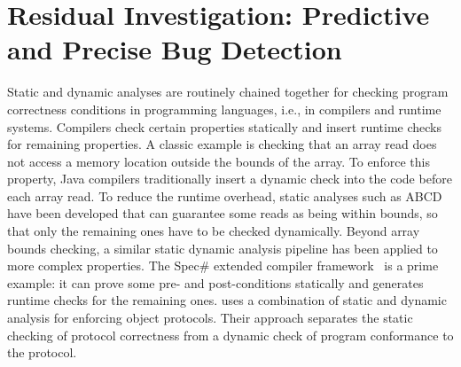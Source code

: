 \section{Residual Investigation: Predictive and Precise Bug Detection}


Static and dynamic analyses are routinely chained together for
checking program correctness conditions in programming languages,
i.e., in compilers and runtime systems. Compilers check certain
properties statically and insert runtime checks for remaining
properties. A classic example is checking that an array read does not
access a memory location outside the bounds of the array. To enforce
this property, Java compilers traditionally insert a dynamic check
into the code before each array read. To reduce the runtime overhead,
static analyses such as ABCD~\cite{bodik00abcd} have been developed
that can guarantee some reads as being within bounds, so that only the
remaining ones have to be checked dynamically. Beyond array
bounds checking, a similar static dynamic analysis pipeline has been
applied to more complex properties. The Spec\# extended compiler
framework~\cite{barnett04spec} is a prime example: it can prove some
pre- and post-conditions statically and generates runtime checks for
the remaining ones. 
\cite{Gopinathan:2008:EOP:1449764.1449784} uses a combination of static
and dynamic analysis for enforcing object protocols. Their approach
separates the static checking of protocol correctness from a
dynamic check of program conformance to the protocol.


